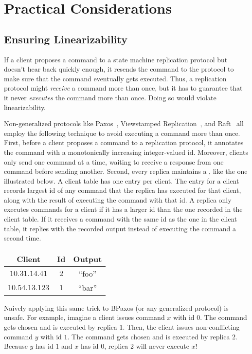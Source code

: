 \section{Practical Considerations}

\subsection{Ensuring Linearizability}
If a client proposes a command to a state machine replication protocol but
doesn't hear back quickly enough, it resends the command to the protocol to
make sure that the command eventually gets executed. Thus, a replication
protocol might \emph{receive} a command more than once, but it has to guarantee
that it never \emph{executes} the command more than once. Doing so would
violate linearizability.

Non-generalized protocols like Paxos~\cite{van2015paxos}, Viewstamped
Replication~\cite{liskov2012viewstamped}, and Raft~\cite{ongaro2014search} all
employ the following technique to avoid executing a command more than once.
First, before a client proposes a command to a replication protocol, it
annotates the command with a monotonically increasing integer-valued id.
Moreover, clients only send one command at a time, waiting to receive a
response from one command before sending another. Second, every replica
maintains a , like the one illustrated below. A client
table has one entry per client. The entry for a client records largest id of
any command that the replica has executed for that client, along with the
result of executing the command with that id. A replica only executes commands
for a client if it has a larger id than the one recorded in the client table.
If it receives a command with the same id as the one in the client table, it
replies with the recorded output instead of executing the command a second
time.

\begin{center}
  \begin{tabular}{|c|c|c|}
    \hline
    \textbf{Client} & \textbf{Id} & \textbf{Output} \\\hline
    $10.31.14.41$   & $2$         & ``foo'' \\
    $10.54.13.123$  & $1$         & ``bar'' \\\hline
  \end{tabular}
\end{center}

Naively applying this same trick to BPaxos (or any generalized protocol) is
unsafe. For example, imagine a client issues command $x$ with id $0$. The
command gets chosen and is executed by replica 1. Then, the client issues
non-conflicting command $y$ with id $1$. The command gets chosen and is
executed by replica 2. Because $y$ has id $1$ and $x$ has id $0$, replica 2
will never execute $x$!

